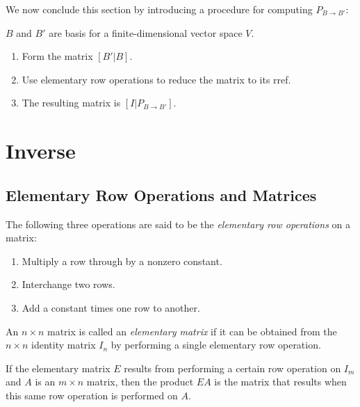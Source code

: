\documentclass{report}
\begin{document}
	We now conclude this section by introducing a procedure for computing $P_{B \rightarrow B'}$:
	\begin{mthd}
		$B$ and $B'$ are basis for a finite-dimensional vector space $V$.
		\begin{enumerate}[label=Step \arabic*.]
			\item Form the matrix $[B'|B]$.
			\item Use elementary row operations to reduce the matrix to its rref.
			\item The resulting matrix is $[I|P_{B\rightarrow B'}]$.
		\end{enumerate}
	\end{mthd}
	

	\section{Inverse}
		\subsection{Elementary Row Operations and Matrices}
		
		\begin{defn}\label{def_elementary_row_operations}
			The following three operations are said to be the \emph{elementary row operations} on a matrix:
			\begin{enumerate}
				\item Multiply a row through by a nonzero constant.
				\item Interchange two rows.
				\item Add a constant times one row to another.
			\end{enumerate}
		\end{defn}
		
		\begin{defn}
			An $n \times n$ matrix is called an \emph{elementary matrix} if it can be obtained from the $n \times n$ identity matrix $I_n$ by performing a single elementary row operation.
		\end{defn}
		
		\begin{thm}
			If the elementary matrix $E$ results from performing a certain row operation on $I_m$ and $A$ is an $m \times n$ matrix, then the product $EA$ is the matrix that results when this same row operation is performed on $A$.
		\end{thm}
		
\end{document}
